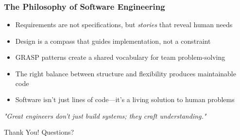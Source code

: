 \documentclass{beamer}
\begin{document}
\begin{frame}
  \frametitle{The Philosophy of Software Engineering}
  
  
  \vspace{-0.3cm}
  
  \begin{bluebox}
    \begin{itemize}
      \item[\textcolor{rxblue}{\faFileAlt}] Requirements are not specifications, but \textit{stories} that reveal human needs
      \item[\textcolor{rxblue}{\faCompass}] Design is a compass that guides implementation, not a constraint
      \item[\textcolor{rxblue}{\faTools}] GRASP patterns create a shared vocabulary for team problem-solving
      \item[\textcolor{rxblue}{\faBalanceScale}] The right balance between structure and flexibility produces maintainable code
      \item[\textcolor{rxblue}{\faHeartbeat}] Software isn't just lines of code—it's a living solution to human problems
    \end{itemize}
  \end{bluebox}
  
  \vspace{0.3cm}
  
  \begin{center}
    \begin{greenbox}
      \centering
      \large \textit{"Great engineers don't just build systems; they craft understanding."}
    \end{greenbox}
  \end{center}
  
  \vspace{0.3cm}
  
  \begin{center}
    \textcolor{rxgreen}{\large Thank You! Questions?}
  \end{center}
\end{frame}
\end{document}

